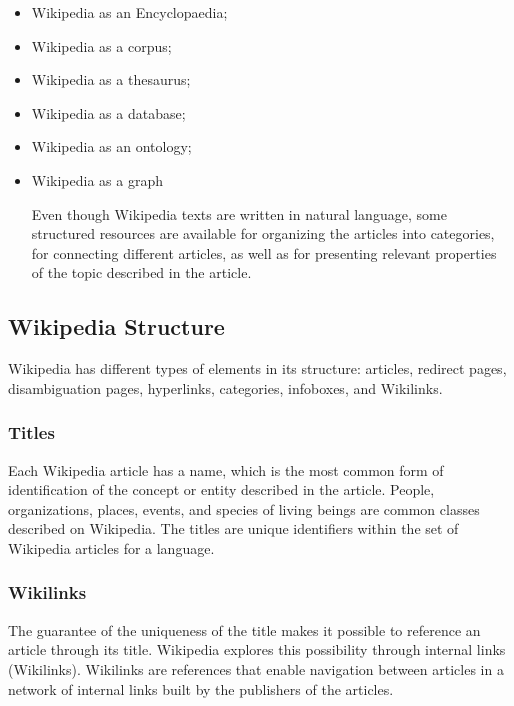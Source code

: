 \begin{itemize}
\item Wikipedia as an Encyclopaedia; 


\item Wikipedia as a corpus; 
\item Wikipedia as a thesaurus; 
\item Wikipedia as a database; 
\item Wikipedia as an ontology; 
\item Wikipedia as a graph


Even though Wikipedia texts are written in natural language, some structured resources are available for organizing the articles into categories, for connecting different articles, as well as for presenting relevant properties of the topic described in the article.

\end{itemize}
\subsection{\hspace*{3pt}Wikipedia Structure}

Wikipedia has different types of elements in its structure: articles, redirect pages, disambiguation pages, hyperlinks, categories, infoboxes, and Wikilinks. 

\subsubsection{\hspace*{3pt}Titles}
Each Wikipedia article has a name, which is the most common form of identification of the concept or entity described in the article.  People, organizations, places, events, and species of living beings are common classes described on Wikipedia. The titles are unique identifiers within the set of Wikipedia articles for a language.

\subsubsection{\hspace*{3pt}Wikilinks}

The guarantee of the uniqueness of the title makes it possible to reference an article through its title. Wikipedia explores this possibility through internal links (Wikilinks).   Wikilinks are references that enable navigation between articles in a network of internal links built by the publishers of the articles. 

